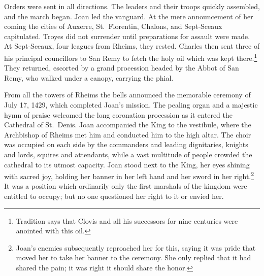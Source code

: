 Orders were sent in all directions. The leaders and their troops quickly
assembled, and the march began. Joan led the vanguard. At the mere
announcement of her coming the cities of Auxerre, St.~Florentin,
Chalons, and Sept-Sceaux capitulated. Troyes did not surrender until
preparations for assault were made. At Sept-Sceaux, four leagues from
Rheims, they rested. Charles then sent three of his principal
councillors to San Remy to fetch the holy oil which was kept
there.\footnote{Tradition says that Clovis and all his successors for
  nine centuries were anointed with this oil.} They returned, escorted
by a grand procession headed by the Abbot of San Remy, who walked under
a canopy, carrying the phial.

From all the towers of Rheims the bells announced the memorable ceremony
of July 17, 1429, which completed Joan's mission. The pealing organ and
a majestic hymn of praise welcomed the long coronation procession as it
entered the Cathedral of St.~Denis. Joan accompanied the King to the
vestibule, where the Archbishop of Rheims met him and conducted him to
the high altar. The choir was occupied on each side by the commanders
and leading dignitaries, knights and lords, squires and attendants,
while a vast multitude of people crowded the cathedral to its utmost
capacity. Joan stood next to the King, her eyes shining with sacred joy,
holding her banner in her left hand and her sword in her
right.\footnote{Joan's enemies subsequently reproached her for this,
  saying it was pride that moved her to take her banner to the ceremony.
  She only replied that it had shared the pain; it was right it should
  share the honor.} It was a position which ordinarily only the first
marshals of the kingdom were entitled to occupy; but no one questioned
her right to it or envied her.
